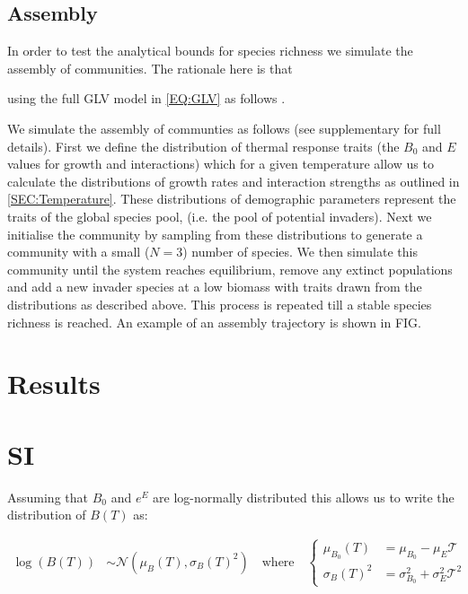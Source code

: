\documentclass{article}
\begin{document}
\subsection{Assembly}

In order to test the analytical bounds for species richness we simulate the assembly of communities. The rationale here is that 

using the full GLV model in \cref{EQ:GLV} as follows . 

We simulate the assembly of communties as follows (see supplementary for full details). First we define the distribution of thermal response traits (the $B_0$ and $E$ values for growth and interactions) which for a given temperature allow us to calculate the distributions of growth rates and interaction strengths as outlined in \cref{SEC:Temperature}. These distributions of demographic parameters represent the traits of the global species pool, (i.e. the pool of potential invaders). Next we initialise the community by sampling from these distributions to generate a community with a small ($N=3$) number of species. We then simulate this community until the system reaches equilibrium, remove any extinct populations and add a new invader species at a low biomass with traits drawn from the distributions as described above. This process is repeated till a stable species richness is reached. An example of an assembly trajectory is shown in FIG. 

\section{Results}



\section{SI}

Assuming that $B_0$ and $e^{E}$ are log-normally distributed this allows us to write the distribution of $B(T)$ as:

\begin{align} \label{EQ:Boltz_dist}
    \log(B(T)) &\sim \mathcal{N}(\mu_{B}(T), \sigma_{B}(T)^2) 
    \quad \text{where} \quad 
     \begin{cases}
     \mu_{B_0}(T) &=  \mu_{B_0} - \mu_{E}\mathcal{T} \\
     \sigma_{B}(T)^2 &= \sigma_{B_0}^2 + \sigma_{E}^2 \mathcal{T}^2 
     \end{cases}
\end{align}
\end{document}
